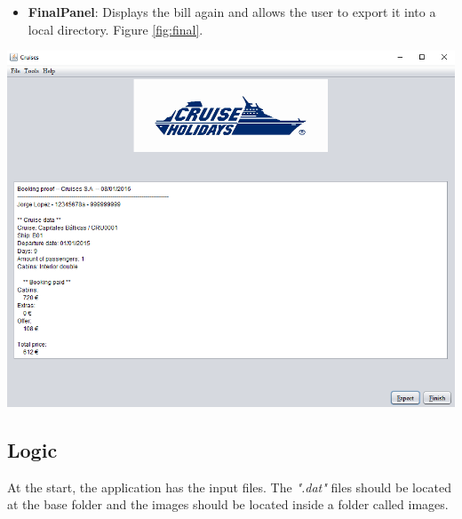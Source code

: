 \documentclass[11pt]{article}
\begin{document}
   	\begin{qn}
		\begin{itemize}
			\item \textbf{FinalPanel}: Displays the bill again and allows the user to export it into a local directory. Figure \ref{fig:final}.
		\end{itemize}   
		\begin{center}
			\begin{minipage}{0.8\linewidth}
				\includegraphics[width=\linewidth]{images/final.png}
				\label{fig:final}
			\end{minipage}
		\end{center}
	\end{qn}

   
	\subsection{Logic}
	At the start, the application has the input files. The \textit{".dat"} files should be located at the base folder and the images should be located inside a folder called images.
   
\end{document}

